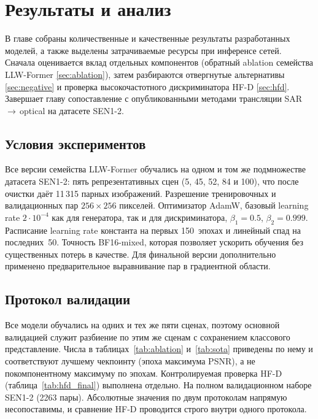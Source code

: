\chapter{Результаты и анализ}
\label{sec:Chapter5} 

В главе собраны количественные и качественные результаты разработанных моделей, а также выделены затрачиваемые ресурсы при инференсе сетей.
Сначала оценивается вклад отдельных компонентов (обратный ablation семейства
LLW-Former \ref{sec:ablation}), затем разбираются отвергнутые
альтернативы \ref{sec:negative} и проверка высокочастотного дискриминатора HF-D \ref{sec:hfd}.
Завершает главу сопоставление с опубликованными
методами трансляции SAR\,$\to$\,optical на датасете SEN1-2.

\section{Условия экспериментов}
\label{sec:setup}

Все версии семейства LLW-Former обучались на одном и том же подмножестве датасета
SEN1-2: пять репрезентативных сцен (5, 45, 52, 84 и 100), что после очистки даёт
11\,315 парных изображений. Разрешение тренировочных и валидационных пар
$256\times 256$ пикселей. Оптимизатор AdamW, базовый learning
rate $2{\cdot}10^{-4}$ как для генератора, так и для дискриминатора,
$\beta_{1}=0.5$, $\beta_{2}=0.999$. Расписание learning rate константа на
первых 150~эпохах и линейный спад на последних~50. Точность BF16-mixed, которая позволяет ускорить обучения без существенных потерь в качестве.
Для финальной версии дополнительно применено предварительное выравнивание пар в
градиентной области.

\section{Протокол валидации}
Все модели обучались на одних и тех же пяти сценах,
поэтому основной валидацией служит разбиение по этим же сценам с сохранением классового представление.
Числа в таблицах~\ref{tab:ablation} и~\ref{tab:sota} приведены по нему и соответствуют
лучшему чекпоинту (эпоха максимума PSNR), а не покомпонентному максимуму по эпохам.
Контролируемая проверка HF-D (таблица~\ref{tab:hfd_final}) выполнена отдельно. На
полном валидационном наборе SEN1-2 (2263 пары). Абсолютные
значения по двум протоколам напрямую несопоставимы, и сравнение HF-D проводится
строго внутри одного протокола.

